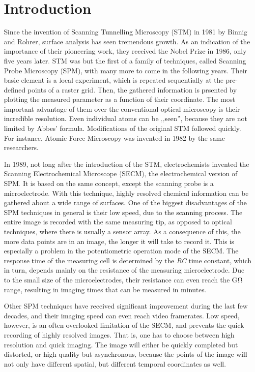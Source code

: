 \chapter{Introduction}
\pagestyle{headings}
Since the invention of Scanning Tunnelling Microscopy (STM) in 1981 by Binnig and Rohrer, surface analysis has seen tremendous growth.
As an indication of the importance of their pioneering work, they received the Nobel Prize in 1986, only five years later.
STM was but the first of a family of techniques, called Scanning Probe Microscopy (SPM), with many more to come in the following years.
Their basic element is a local experiment, which is repeated sequentially at the pre-defined points of a raster grid.
Then, the gathered information is prsented by plotting the measured parameter as a function of their coordinate.
The most important advantage of them over the conventional optical microscopy is their incredible resolution.
Even individual atoms can be ,,seen'', because they are not limited by Abbes' formula.
Modifications of the original STM followed quickly.
For instance, Atomic Force Microscopy was invented in 1982 by the same researchers.

In 1989, not long after the introduction of the STM, electrochemists invented the Scanning Electrochemical Microscope (SECM), the electrochemical version of SPM.
It is based on the same concept, except the scanning probe is a microelectrode.
With this technique, highly resolved chemical information can be gathered about a wide range of surfaces.
One of the biggest disadvantages of the SPM techniques in general is their low speed, due to the scanning process.
The entire image is recorded with the same measuring tip, as opposed to optical techniques, where there is usually a sensor array.
As a consequence of this, the more data points are in an image, the longer it will take to record it.
This is especially a problem in the potentiometric operation mode of the SECM.
The response time of the measuring cell is determined by the \emph{RC} time constant, which in turn, depends mainly on the resistance of the measuring microelectrode.
Due to the small size of the microelectrodes, their resistance can even reach the G$\ohm$ range, resulting in imaging times that can be measured in minutes.

Other SPM techniques have received significant improvement during the last few decades, and their imaging speed can even reach video framerates.
Low speed, however, is an often overlooked limitation of the SECM, and prevents the quick recording of highly resolved images.
That is, one has to choose between high resolution and quick imaging.
The image will either be quickly completed but distorted, or high quality but asynchronous, because the points of the image will not only have different spatial, but different temporal coordinates as well.

